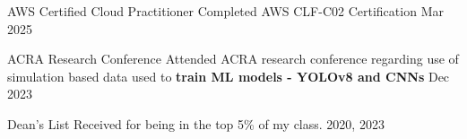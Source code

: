 
\begin{cvhonors}

	\cvhonor
	{AWS Certified Cloud Practitioner}
	{Completed AWS CLF-C02 Certification}
	{}
	{Mar 2025}

	\cvhonor
	{ACRA Research Conference}
	{Attended ACRA research conference regarding use of simulation based data used to \textbf{train ML models - YOLOv8 and CNNs}}
	{}
	{Dec 2023}


	\cvhonor
	{Dean's List}
	{Received for being in the top 5\% of my class.}
	{}
	{2020, 2023}
\end{cvhonors}
